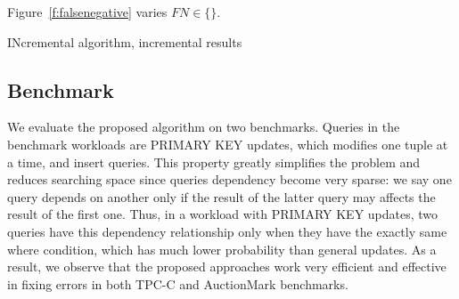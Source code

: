 Figure~\ref{f:falsenegative} varies $FN \in \{\}$.

INcremental algorithm, incremental results






%
% 
% 
% 
% 
% 
% 
% 
% 




\subsection{Benchmark}
We evaluate the proposed algorithm on two benchmarks. Queries in the benchmark 
workloads are PRIMARY KEY updates, which modifies one tuple at a time, and insert queries. 
This property greatly simplifies the problem and reduces searching space since queries dependency 
become very sparse: we say one query depends on another only if the result of the latter
query may affects the result of the first one. Thus, in a workload with PRIMARY KEY
updates, two queries have this dependency relationship only
when they have the exactly same where condition, which has much lower probability than 
general updates. As a result, we observe that the proposed approaches work
very efficient and effective 
in fixing errors in both TPC-C and AuctionMark benchmarks. 




